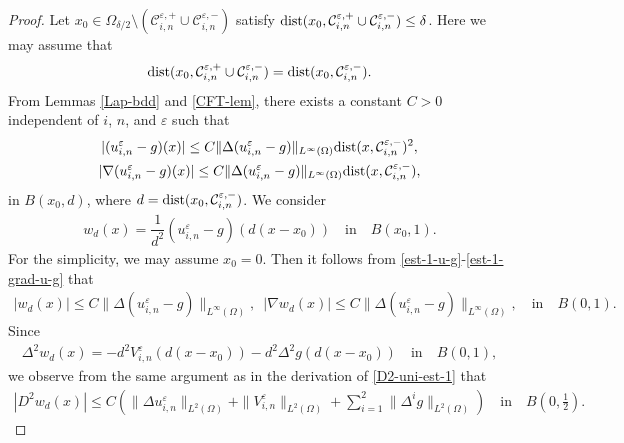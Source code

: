 \documentclass[12pt]{amsart}
\begin{document}
\begin{proof}
Let $x_{0} \in \Omega_{{\delta}/2} \setminus ({\mathcal{C}}^{{\varepsilon},+}_{i,n} \cup {\mathcal{C}}^{{\varepsilon},-}_{i,n})$ satisfy 
${\rm dist}(x_{0},{\mathcal{C}}^{{\varepsilon},+}_{i,n} \cup {\mathcal{C}}^{{\varepsilon},-}_{i,n}) \le {\delta}$. 
Here we may assume that 
\begin{align*}
{\rm dist}(x_{0},{\mathcal{C}}^{{\varepsilon},+}_{i,n} \cup {\mathcal{C}}^{{\varepsilon},-}_{i,n})= {\rm dist}(x_{0},{\mathcal{C}}^{{\varepsilon},-}_{i,n}). 
\end{align*}
From Lemmas \ref{Lap-bdd} and \ref{CFT-lem}, there exists a constant $C>0$ independent of $i$, $n$, and ${\varepsilon}$ such that 
\begin{gather}
| (u^{\varepsilon}_{i,n} - g)(x)| 
 \le C \| \Delta (u^{\varepsilon}_{i,n} - g) \|_{L^{\infty}(\Omega)} {\rm dist}(x,{\mathcal{C}}^{{\varepsilon},-}_{i,n})^{2}, \label{est-1-u-g}\\
| \nabla (u^{\varepsilon}_{i,n} - g)(x)| 
  \le C \| \Delta (u^{\varepsilon}_{i,n} - g) \|_{L^{\infty}(\Omega)} {\rm dist}(x,{\mathcal{C}}^{{\varepsilon},-}_{i,n}), \label{est-1-grad-u-g}
\end{gather}
in $B(x_{0},d)$, where $d= {\rm dist}(x_{0},{\mathcal{C}}^{{\varepsilon},-}_{i,n})$. 
We consider 
\begin{align*}
w_{d}(x)= \dfrac{1}{d^{2}}(u^{\varepsilon}_{i,n}-g)(d(x-x_{0})) \quad \text{in} \quad B(x_{0},1). 
\end{align*}
For the simplicity, we may assume $x_{0}=0$. Then it follows from \eqref{est-1-u-g}-\eqref{est-1-grad-u-g} that 
\begin{align*}
| w_{d}(x) | \le C \| \Delta (u^{\varepsilon}_{i,n} - g) \|_{L^{\infty}(\Omega)}, \,\,\,
| \nabla w_{d}(x) | \le C \| \Delta (u^{\varepsilon}_{i,n} - g) \|_{L^{\infty}(\Omega)}, \quad \text{in} \quad B(0,1). 
\end{align*}
Since  
\begin{align*}
\Delta^2 w_d(x) = - d^2 V^{\varepsilon}_{i,n}(d(x-x_{0})) - d^2 \Delta^2 g(d(x-x_{0})) \quad \text{in} \quad B(0,1), 
\end{align*}
we observe from the same argument as in the derivation of \eqref{D2-uni-est-1} that 
\begin{align*}
| D^2 w_d(x) | \le C ( \| \Delta u^{\varepsilon}_{i,n} \|_{L^{2}(\Omega)} + \| V^{\varepsilon}_{i,n} \|_{L^{2}(\Omega)} 
                      + \sum^{2}_{i=1} \| \Delta^{i} g \|_{L^{2}(\Omega)} ) 
                       \quad \text{in} \quad B(0, \tfrac{1}{2}). 
\end{align*}

\end{proof}
\end{document}

